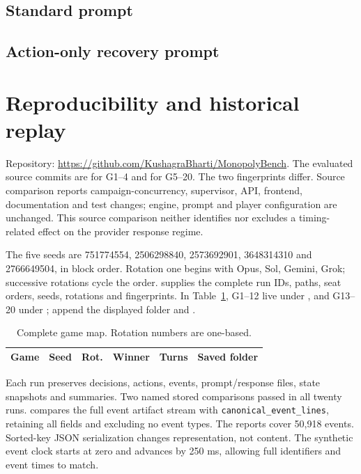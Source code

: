 \subsection*{Standard prompt}

\clearpage
\subsection*{Action-only recovery prompt}


\section{Reproducibility and historical replay}
\label{app:reproduce}
Repository: \url{https://github.com/KushagraBharti/MonopolyBench}. The evaluated source commits are  for G1--4 and  for G5--20. The two fingerprints differ. Source comparison reports campaign-concurrency, supervisor, API, frontend, documentation and test changes; engine, prompt and player configuration are unchanged. This source comparison neither identifies nor excludes a timing-related effect on the provider response regime.

The five seeds are 751774554, 2506298840, 2573692901, 3648314310 and 2766649504, in block order. Rotation one begins with Opus, Sol, Gemini, Grok; successive rotations cycle the order.  supplies the complete run IDs, paths, seat orders, seeds, rotations and fingerprints. In Table~\ref{tab:games}, G1--12 live under , and G13--20 under ; append the displayed folder and .
\small
\begin{longtable}{@{}rrrrrl@{}}
\caption{Complete game map. Rotation numbers are one-based.}\label{tab:games}\\\toprule
Game & Seed & Rot. & Winner & Turns & Saved folder\\\midrule\endhead

\end{longtable}\normalsize

Each run preserves decisions, actions, events, prompt/response files, state snapshots and summaries. Two named stored comparisons passed in all twenty runs.  compares the full event artifact stream with \texttt{canonical\_event\_lines}, retaining all fields and excluding no event types. The reports cover 50,918 events. Sorted-key JSON serialization changes representation, not content. The synthetic event clock starts at zero and advances by 250 ms, allowing full identifiers and event times to match.


